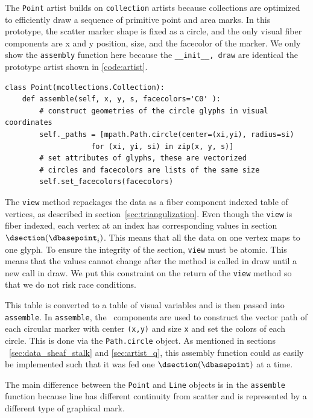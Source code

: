 \documentclass[../main.tex]{subfiles}
\begin{document}
The \texttt{Point} artist builds on \texttt{collection} artists because collections are optimized to efficiently draw a sequence of primitive point and area marks. In this prototype, the scatter marker shape is fixed as a circle, and the only visual fiber components are x and y position, size, and the facecolor of the marker. We only show the \texttt{assembly} function here because the \texttt{__init__, draw} are identical the prototype artist shown in \ref{code:artist}. 
\begin{verbatim}
class Point(mcollections.Collection):
    def assemble(self, x, y, s, facecolors='C0' ):
        # construct geometries of the circle glyphs in visual coordinates
        self._paths = [mpath.Path.circle(center=(xi,yi), radius=si) 
                    for (xi, yi, si) in zip(x, y, s)] 
        # set attributes of glyphs, these are vectorized 
        # circles and facecolors are lists of the same size
        self.set_facecolors(facecolors)
\end{verbatim} 
The \texttt{view} method repackages the data as a fiber component indexed table of vertices, as described in section~\ref{sec:triangulization}. Even though the \texttt{view} is fiber indexed, each vertex at an index \dbasepoint has corresponding values in section $\dsection(\dbasepoint_{i})$. This means that all the data on one vertex maps to one glyph. To ensure the integrity of the section, \texttt{view} must be atomic. This means that the values cannot change after the method is called in draw until a new call in draw. We put this constraint on the return of the \texttt{view} method so that we do not risk race conditions. 

This table is converted to a table of visual variables and is then passed into \texttt{assemble}. In  \texttt{assemble}, the \vsection\ components are used to construct the vector path of each circular marker with center \texttt{(x,y)} and size \texttt{x} and set the colors of each circle. This is done via the \texttt{Path.circle} object. As mentioned in sections ~\ref{sec:data_sheaf_stalk} and \ref{sec:artist_q}, this assembly function could as easily be implemented such that it was fed one $\dsection(\dbasepoint)$ at a time. 

The main difference between the \texttt{Point} and \texttt{Line} objects is in the \texttt{assemble} function because line has different continuity from scatter and is represented by a different type of graphical mark. 
\end{document}
